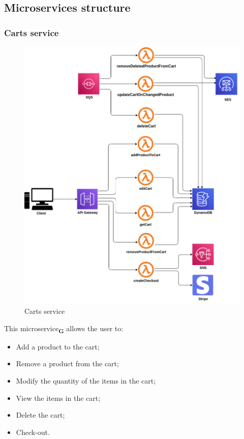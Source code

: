 \subsection{Microservices structure}
\subsubsection{Carts service}
\begin{figure}[!h]
    \vspace{5px}
    \includegraphics[scale=0.5]{../../../../Images/Diagrammi/maintainerManual/cartService.png}
    \centering
    \caption{Carts service}
\end{figure}
\pagebreak
This microservice\textsubscript{\textbf{G}} allows the user to:
\begin{itemize}
    \item Add a product to the cart;
    \item Remove a product from the cart;
    \item Modify the quantity of the items in the cart;
    \item View the items in the cart;
    \item Delete the cart;
    \item Check-out.
\end{itemize}
